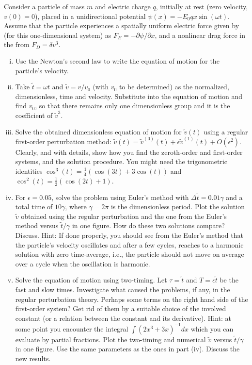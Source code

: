\documentclass[12pt]{article}
\begin{document}


\begin{ex}

  Consider a particle of mass $m$ and electric charge $q$, initially at rest (zero velocity, $v(0)=0$), placed in a unidirectional potential $\psi(x)=-E_0qx\sin(\omega t)$. Assume that the particle experiences a spatially uniform electric force given by (for this one-dimensional system) as $F_E=-\partial\psi/\partial x$, and a nonlinear drag force in the from $F_D=\delta v^3$.

  \begin{enumerate}[(i)]
  \item Use the Newton's second law to write the equation of motion for the particle's velocity.
  \item Take $\tilde{t}=\omega t$ and $\tilde{v}=v/v_0$ (with $v_0$ to be determined) as the normalized, dimensionless, time and velocity. Substitute into the equation of motion and find $v_0$, so that there remains only one dimensionless group and it is the coefficient of $\tilde{v}^3$.
  \item Solve the obtained dimensionless equation of motion for $\tilde{v}(t)$ using a regular first-order perturbation method: $\tilde{v}(t)=\tilde{v}^{(0)}(t)+\epsilon \tilde{v}^{(1)}(t)+O(\epsilon^2)$. Clearly, and with details, show how you find the zeroth-order and first-order systems, and the solution procedure. You might need the trigonometric identities $\cos^3(t)=\tfrac{1}{4}(\cos(3t)+3\cos(t))$ and $\cos^2(t)=\tfrac{1}{2}(\cos(2t)+1)$.
  \item For $\epsilon=0.05$, solve the problem using Euler's method with $\Delta\tilde{t}=0.01\gamma$ and a total time of $10\gamma$, where $\gamma=2\pi$ is the dimensionless period. Plot the solution $\tilde{v}$ obtained using the regular perturbation and the one from the Euler's method versus $\tilde{t}/\gamma$ in one figure. How do these two solutions compare? Discuss. Hint: If done properly, you should see from the Euler's method that the particle's velocity oscillates and after a few cycles, reaches to a harmonic solution with zero time-average, i.e., the particle should not move on average over a cycle when the oscillation is harmonic.
  \item Solve the equation of motion using two-timing. Let $\tau=\tilde{t}$ and $T=\epsilon\tilde{t}$ be the fast and slow times. Investigate what caused the problems, if any, in the regular perturbation theory. Perhaps some terms on the right hand side of the first-order system? Get rid of them by a suitable choice of the involved constant (or a relation between the constant and its derivative). Hint: at some point you encounter the integral $\int{(2x^3+3x)^{-1}}dx$ which you can evaluate by partial fractions. Plot the two-timing and numerical $\tilde{v}$ versus $\tilde{t}/\gamma$ in one figure. Use the same parameters as the ones in part (iv). Discuss the new results.
  \end{enumerate}
  

\end{ex}
\end{document}
